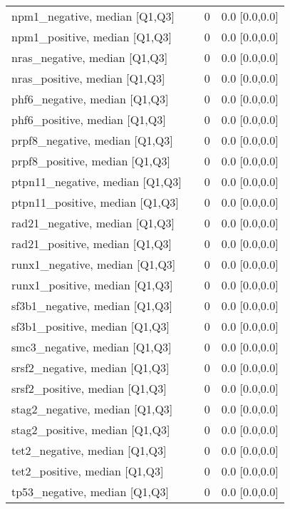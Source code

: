 \begin{tabular}{llll}
npm1\_negative, median [Q1,Q3] &    &      0 &     0.0 [0.0,0.0] \\
npm1\_positive, median [Q1,Q3] &    &      0 &     0.0 [0.0,0.0] \\
nras\_negative, median [Q1,Q3] &    &      0 &     0.0 [0.0,0.0] \\
nras\_positive, median [Q1,Q3] &    &      0 &     0.0 [0.0,0.0] \\
phf6\_negative, median [Q1,Q3] &    &      0 &     0.0 [0.0,0.0] \\
phf6\_positive, median [Q1,Q3] &    &      0 &     0.0 [0.0,0.0] \\
prpf8\_negative, median [Q1,Q3] &    &      0 &     0.0 [0.0,0.0] \\
prpf8\_positive, median [Q1,Q3] &    &      0 &     0.0 [0.0,0.0] \\
ptpn11\_negative, median [Q1,Q3] &    &      0 &     0.0 [0.0,0.0] \\
ptpn11\_positive, median [Q1,Q3] &    &      0 &     0.0 [0.0,0.0] \\
rad21\_negative, median [Q1,Q3] &    &      0 &     0.0 [0.0,0.0] \\
rad21\_positive, median [Q1,Q3] &    &      0 &     0.0 [0.0,0.0] \\
runx1\_negative, median [Q1,Q3] &    &      0 &     0.0 [0.0,0.0] \\
runx1\_positive, median [Q1,Q3] &    &      0 &     0.0 [0.0,0.0] \\
sf3b1\_negative, median [Q1,Q3] &    &      0 &     0.0 [0.0,0.0] \\
sf3b1\_positive, median [Q1,Q3] &    &      0 &     0.0 [0.0,0.0] \\
smc3\_negative, median [Q1,Q3] &    &      0 &     0.0 [0.0,0.0] \\
srsf2\_negative, median [Q1,Q3] &    &      0 &     0.0 [0.0,0.0] \\
srsf2\_positive, median [Q1,Q3] &    &      0 &     0.0 [0.0,0.0] \\
stag2\_negative, median [Q1,Q3] &    &      0 &     0.0 [0.0,0.0] \\
stag2\_positive, median [Q1,Q3] &    &      0 &     0.0 [0.0,0.0] \\
tet2\_negative, median [Q1,Q3] &    &      0 &     0.0 [0.0,0.0] \\
tet2\_positive, median [Q1,Q3] &    &      0 &     0.0 [0.0,0.0] \\
tp53\_negative, median [Q1,Q3] &    &      0 &     0.0 [0.0,0.0] \\

\end{tabular}
